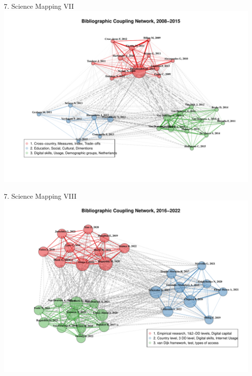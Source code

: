 \documentclass[
  ignorenonframetext,
]{beamer}
\begin{document}
\begin{frame}{7. Science Mapping VII}
\protect\hypertarget{science-mapping-vii}{}
\includegraphics{Presentation_bibliometric_Madrid_june_20_files/figure-beamer/Bib_coup_P2-1.pdf}
\end{frame}

\begin{frame}{7. Science Mapping VIII}
\protect\hypertarget{science-mapping-viii}{}
\includegraphics{Presentation_bibliometric_Madrid_june_20_files/figure-beamer/Bib_coup_P3-1.pdf}
\end{frame}
\end{document}

